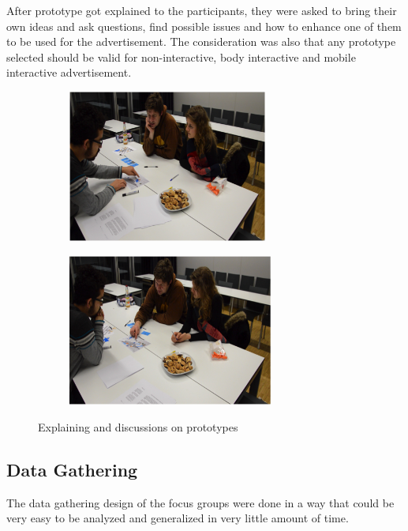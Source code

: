 After prototype got explained to the participants, they were asked to bring their own ideas and ask questions, find possible issues and how to enhance one of them to be used for the advertisement. The consideration was also that any prototype selected should be valid for non-interactive, body interactive and mobile interactive advertisement.


\begin{figure}[H]
    \centering
    \begin{subfigure}[H]{0.45\textwidth}
        \centering
        \includegraphics[width=\textwidth,height=5cm]{Figures/4/show_map}
        \caption{}
        \label{fig:showmap}
    \end{subfigure}
    \begin{subfigure}[H]{0.45\textwidth}
        \centering
        \includegraphics[width=\textwidth,height=5cm]{Figures/4/tell_map}
        \caption{}
        \label{fig:tell_map}
    \end{subfigure}
    \caption{Explaining and discussions on prototypes }
    \label{fig:explaining_and_discussion}
\end{figure}

\subsection{Data Gathering}
The data gathering design of the focus groups were done in a way that could be very easy to be analyzed and generalized in very little amount of time. 


